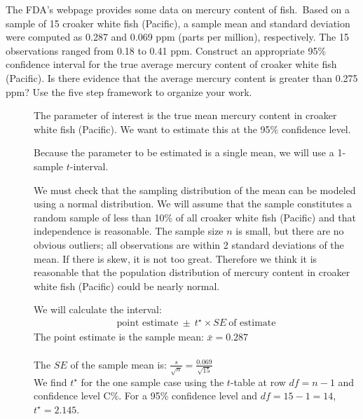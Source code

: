 \begin{examplewrap}
\begin{nexample}
{The FDA's webpage provides some data on mercury content of fish.\footnotemark\, Based on a sample of 15 croaker white fish (Pacific), a sample mean and standard deviation were computed as 0.287 and 0.069 ppm (parts per million), respectively. The 15 observations ranged from 0.18 to 0.41 ppm. Construct an appropriate 95\% confidence interval for the true average mercury content of croaker white fish (Pacific). Is there evidence that the average mercury content is greater than 0.275 ppm?  Use the five step framework to organize your work.  
}
\label{croakerWhiteFishPacificExerConditions}
\begin{description}
\item[] The parameter of interest is the true mean mercury content in croaker white fish (Pacific).  We want to estimate this at the 95\% confidence level.  
\item[] Because the parameter to be estimated is a single mean, we will use a 1-sample $t$-interval.
\item[] We must check that the sampling distribution of the mean can be modeled using a normal distribution.  We will assume that the sample constitutes a random sample of less than 10\% of all croaker white fish (Pacific) and that independence is reasonable. The sample size $n$ is small, but there are no obvious outliers; all observations are within 2 standard deviations of the mean. If there is skew, it is not too great. Therefore we think it is reasonable that the population distribution of mercury content in croaker white fish (Pacific) could be nearly normal.  
\item[]  We will calculate the interval:
\begin{align*}
\text{point estimate}\ \pm\ t^{\star} \times SE\ \text{of estimate}
\end{align*}
The point estimate is the sample mean: $\bar{x}= 0.287$\\
\\
The $SE$ of the sample mean is: $ \frac{s}{\sqrt{n}} = \frac{0.069}{\sqrt{15}}$ \\

We find $t^{\star}$ for the one sample case using the $t$-table at row $df = n -1$ and confidence level C\%.  For a 95\% confidence level and $df = 15 - 1 = 14$, $t^{\star} = 2.145$.\\


\end{description}
\end{nexample}
\end{examplewrap}
